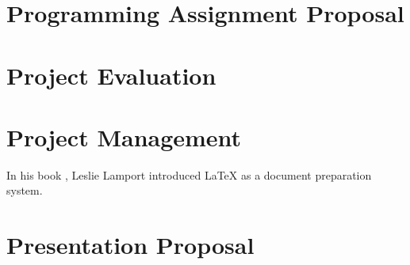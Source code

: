 \documentclass{article}
\begin{document}
\section{Programming Assignment Proposal}

\section{Project Evaluation}

\section{Project Management}
In his book \cite{lamport94}, Leslie Lamport introduced LaTeX as a document preparation system.

\section{Presentation Proposal}




\end{document}
